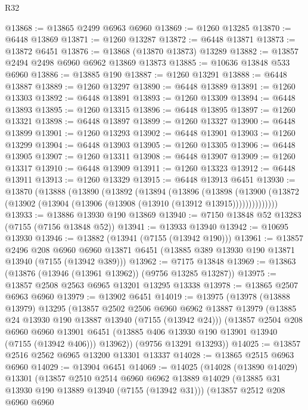 \begin{lexlean}{R32}
\begin{coremodule}
@13868 := @13865 @2499 @6963 @6960
@13869 := @1260 @13285
@13870 := @6448 @13869
@13871 := @1260 @13287
@13872 := @6448 @13871
@13873 := @13872 @6451
@13876 := @13868 (@13870 @13873) @13289
@13882 := @13857 @2494 @2498 @6960 @6962 @13869 @13873
@13885 := @10636 @13848 @533 @6960
@13886 := @13885 @190
@13887 := @1260 @13291
@13888 := @6448 @13887
@13889 := @1260 @13297
@13890 := @6448 @13889
@13891 := @1260 @13303
@13892 := @6448 @13891
@13893 := @1260 @13309
@13894 := @6448 @13893
@13895 := @1260 @13315
@13896 := @6448 @13895
@13897 := @1260 @13321
@13898 := @6448 @13897
@13899 := @1260 @13327
@13900 := @6448 @13899
@13901 := @1260 @13293
@13902 := @6448 @13901
@13903 := @1260 @13299
@13904 := @6448 @13903
@13905 := @1260 @13305
@13906 := @6448 @13905
@13907 := @1260 @13311
@13908 := @6448 @13907
@13909 := @1260 @13317
@13910 := @6448 @13909
@13911 := @1260 @13323
@13912 := @6448 @13911
@13913 := @1260 @13329
@13915 := @6448 @13913 @6451
@13930 := @13870
    (@13888
      (@13890
        (@13892
          (@13894
            (@13896
              (@13898
                (@13900 (@13872 (@13902 (@13904 (@13906 (@13908 (@13910 (@13912 @13915))))))))))))))
@13933 := @13886 @13930 @190 @13869
@13940 := @7150 @13848 @52 @13283 (@7155 (@7156 @13848 @52))
@13941 := @13933 @13940
@13942 := @10695 @13930
@13946 := @13882 (@13941 (@7155 (@13942 @190)))
@13961 := @13857
    @2496
    @208
    @6960
    @6960
    @13871
    @6451
    (@13885 @389 @13930 @190 @13871 @13940 (@7155 (@13942 @389)))
@13962 := @7175 @13848
@13969 := @13863 (@13876 (@13946 (@13961 @13962)) (@9756 @13285 @13287))
@13975 := @13857 @2508 @2563 @6965 @13201 @13295 @13338
@13978 := @13865 @2507 @6963 @6960
@13979 := @13902 @6451
@14019 := @13975
    (@13978
      (@13888 @13979)
      @13295
      (@13857
        @2502
        @2506
        @6960
        @6962
        @13887
        @13979
        (@13885 @24 @13930 @190 @13887 @13940 (@7155 (@13942 @24)))
        (@13857
          @2504
          @208
          @6960
          @6960
          @13901
          @6451
          (@13885 @406 @13930 @190 @13901 @13940 (@7155 (@13942 @406)))
          @13962))
      (@9756 @13291 @13293))
@14025 := @13857 @2516 @2562 @6965 @13200 @13301 @13337
@14028 := @13865 @2515 @6963 @6960
@14029 := @13904 @6451
@14069 := @14025
    (@14028
      (@13890 @14029)
      @13301
      (@13857
        @2510
        @2514
        @6960
        @6962
        @13889
        @14029
        (@13885 @31 @13930 @190 @13889 @13940 (@7155 (@13942 @31)))
        (@13857
          @2512
          @208
          @6960
          @6960

\end{coremodule}
\end{lexlean}
